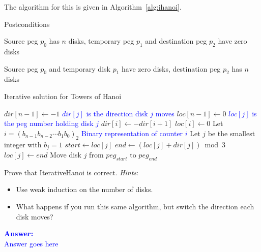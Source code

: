 The algorithm for this is given in Algorithm~\ref{alg:ihanoi}.

\begin{algorithm}[H]
  \vskip6pt
  \begin{labeling}{Postconditions}
    \item [\bf Preconditions] Source peg $p_0$ has $n$ disks, temporary
    peg $p_1$ and destination peg $p_2$ have zero disks
    \item [\bf Postconditions] Source peg $p_0$ and temporary disk $p_1$ have
    zero disks, destination peg $p_2$ has $n$ disks
  \end{labeling}

  \caption{Iterative solution for Towers of Hanoi}\label{alg:ihanoi}
  \begin{algorithmic}[1]
      \State $dir[n-1]\gets-1$
      \Comment\textcolor{blue}{$dir[j]$ is the direction disk $j$ moves}
      \State $loc[n-1]\gets0$
      \Comment\textcolor{blue}{$loc[j]$ is the peg number holding disk $j$}
        \State $dir[i]\gets-dir[i+1]$
        \State $loc[i]\gets0$
      \EndFor
      \Statex
        \State Let $i=(b_{n-1}b_{n-2}\cdots b_1b_0)_2$
        \Comment\textcolor{blue}{Binary representation of counter $i$}
        \State Let $j$ be the smallest integer with $b_j=1$
        \Statex
        \State $start\gets loc[j]$
        \State $end\gets (loc[j]+dir[j])\bmod3$
        \State $loc[j]\gets end$
        \Statex
        \State Move disk $j$ from $peg_{start}$ to $peg_{end}$
      \EndFor
    \EndProcedure
  \end{algorithmic}
\end{algorithm}
Prove that {\sc IterativeHanoi} is correct.\parend
\emph{Hints}\/:
\begin{itemize}
  \item Use weak induction on the number of disks.
  \item What happens if you run this same algorithm, but switch the direction
    each disk moves?
\end{itemize}
\ifanswers
\textcolor{blue}{
\textbf{Answer:}\\[6pt]
Answer goes here
}
\newpage
\fi
